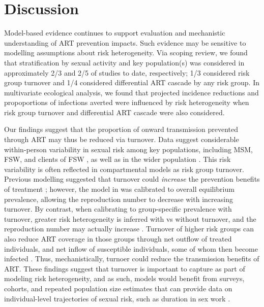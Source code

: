\section{Discussion}
\label{s:disc}
Model-based evidence continues to support
evaluation and mechanistic understanding of ART prevention impacts.
Such evidence may be sensitive to modelling assumptions about risk heterogeneity.
Via scoping review, we found that stratification by sexual activity and key population(s)
was considered in approximately 2/3 and 2/5 of studies to date, respectively;
1/3 considered risk group turnover and 1/4 considered differential ART cascade by any risk group.
In multivariate ecological analysis, we found that
projected incidence reductions and propoportions of infections averted
were influenced by risk heterogeneity when risk group turnover and differential ART cascade were also considered.
\par  %
Our findings suggest that the proportion of onward transmission prevented through ART may thus be reduced via turnover. %
Data suggest considerable within-person variability in sexual risk among key populations,
including MSM, FSW, and clients of FSW \cite{Fazito2012,Romero-Severson2012,Roberts2020},
as well as in the wider population \cite{Houle2018}.
This risk variability is often reflected in compartmental models as risk group turnover.
Previous modelling suggested that
turnover could \emph{increase} the prevention benefits of treatment \cite{Henry2015};
however, the model in \cite{Henry2015} was calibrated to overall equilibrium prevalence,
allowing the reproduction number to decrease with increasing turnover.
By contrast, when calibrating to group-specific prevalence with turnover,
greater risk heterogeneity is inferred with vs without turnover,
and the reproduction number may actually increase \cite{Knight2020}.
Turnover of higher risk groups can also reduce ART coverage in those groups through
net outflow of treated individuals, and net inflow of susceptible individuals,
some of whom then become infected \cite{Knight2020}. 
Thus, mechanistically, turnoer could reduce the transmission benefits of ART.
These findings suggest that turnover is important to capture as part of modeling risk heterogeneity, and as such,
models would benefit from surveys, cohorts, and repeated population size estimates
that can provide data on individual-level trajectories of sexual risk,
such as duration in sex work \cite{Watts2010}.
\par
